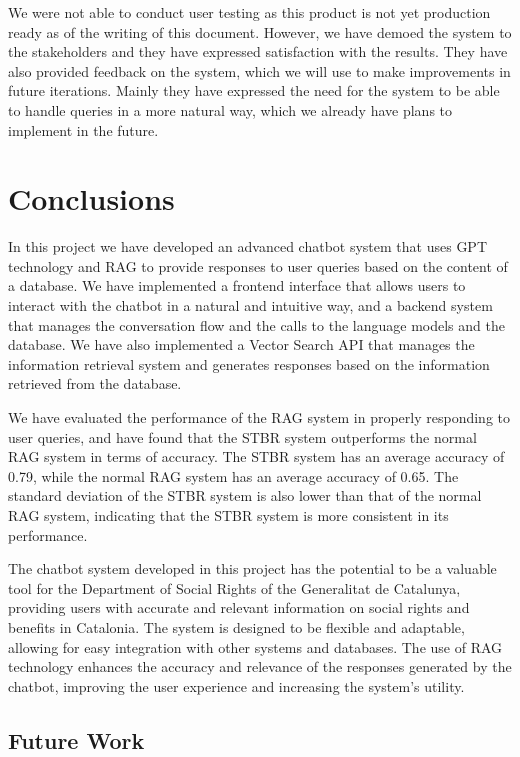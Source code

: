 \documentclass[a4paper,12pt,twoside]{ThesisStyle}
\begin{document}
We were not able to conduct user testing as this product is not yet production ready as of the writing of this document. However, we have demoed the system to the stakeholders and they have expressed satisfaction with the results. They have also provided feedback on the system, which we will use to make improvements in future iterations. Mainly they have expressed the need for the system to be able to handle queries in a more natural way, which we already have plans to implement in the future.

\chapter{Conclusions}
\label{cap:conclusions}

In this project we have developed an advanced chatbot system that uses GPT technology and RAG to provide responses to user queries based on the content of a database. We have implemented a frontend interface that allows users to interact with the chatbot in a natural and intuitive way, and a backend system that manages the conversation flow and the calls to the language models and the database. We have also implemented a Vector Search API that manages the information retrieval system and generates responses based on the information retrieved from the database.

We have evaluated the performance of the RAG system in properly responding to user queries, and have found that the STBR system outperforms the normal RAG system in terms of accuracy. The STBR system has an average accuracy of 0.79, while the normal RAG system has an average accuracy of 0.65. The standard deviation of the STBR system is also lower than that of the normal RAG system, indicating that the STBR system is more consistent in its performance.

The chatbot system developed in this project has the potential to be a valuable tool for the Department of Social Rights of the Generalitat de Catalunya, providing users with accurate and relevant information on social rights and benefits in Catalonia. The system is designed to be flexible and adaptable, allowing for easy integration with other systems and databases. The use of RAG technology enhances the accuracy and relevance of the responses generated by the chatbot, improving the user experience and increasing the system's utility.

\section{Future Work}
\label{sec:future_work}
\end{document}
